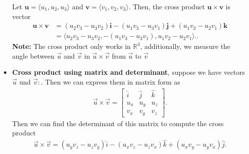 \documentclass{report}
\begin{document}
\begin{itemize}
        \bigbreak \noindent 
        Let $\mathbf{u} = \langle u_1, u_2, u_3 \rangle$ and $\mathbf{v} = \langle v_1, v_2, v_3 \rangle$.
        Then, the cross product $\mathbf{u} \times \mathbf{v}$ is vector
        \begin{align*}
            \mathbf{u} \times \mathbf{v} &= (u_2 v_3 - u_3 v_2) \mathbf{i} - (u_1 v_3 - u_3 v_1) \mathbf{j} + (u_1 v_2 - u_2 v_1) \mathbf{k}  \\
                                         &= \langle u_2 v_3 - u_3 v_2, -(u_1 v_3 - u_3 v_1), u_1 v_2 - u_2 v_1 \rangle.
        .\end{align*}
        \bigbreak \noindent 
        \textbf{Note:} The cross product only works in $\mathbb{R}^{3}$, additionally, we measure the angle between $\vec{u}$ and $\vec{v}$ in $\vec{u} \times \vec{v}$ from $\vec{u}$ to $\vec{v}$
    \item \textbf{Cross product using matrix and determinant}, suppose we have vectors $\vec{u}$ und $\vec{v}:$. Then we can express them in matrix form as
        \begin{align*}
            \vec{u} \times \vec{v}  =
            \begin{bmatrix}
                \hat{i} & \hat{j} & \hat{k} \\
                u_{x} & u_{y} & u_{z} \\
                v_{x} & v_{y} & v_{z}
            \end{bmatrix}
        .\end{align*}
        Then we can find the determinant of this matrix to compute the cross product
        \begin{align*}
            \vec{u} \times \vec{v} = (u_{y}v_{z} - u_{z}v_{y})\hat{i} - (u_{x}v_{z}-u_{z}v_{x})\hat{k} + (u_{x}v_{y} - u_{y}v_{x})\hat{j}
        .\end{align*}


\end{itemize}
\end{document}
